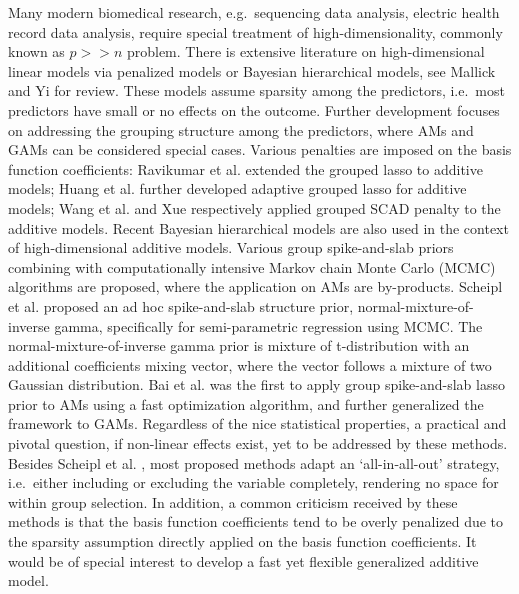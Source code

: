 \documentclass[AMA,STIX1COL,]{WileyNJD-v2}
\begin{document}
Many modern biomedical research, e.g.~sequencing data analysis, electric
health record data analysis, require special treatment of
high-dimensionality, commonly known as \(p >> n\) problem. There is
extensive literature on high-dimensional linear models via penalized
models or Bayesian hierarchical models, see Mallick and Yi
\citep{Mallick2013} for review. These models assume sparsity among the
predictors, i.e.~most predictors have small or no effects on the
outcome. Further development focuses on addressing the grouping
structure among the predictors, where AMs and GAMs can be considered
special cases. Various penalties are imposed on the basis function
coefficients: Ravikumar et al. \citep{Ravikumar2009} extended the
grouped lasso \citep{Yuan2006} to additive models; Huang et al.
\citep{Huang2010} further developed adaptive grouped lasso for additive
models; Wang et al. \citep{Wang2007} and Xue \citep{Xue2009}
respectively applied grouped SCAD penalty \citep{Fan2001} to the
additive models. Recent Bayesian hierarchical models are also used in
the context of high-dimensional additive models. Various group
spike-and-slab priors combining with computationally intensive Markov
chain Monte Carlo (MCMC) algorithms \citep{Xu2015, Yang2020} are
proposed, where the application on AMs are by-products. Scheipl et al.
\citep{Scheipl2012} proposed an ad hoc spike-and-slab structure prior,
normal-mixture-of-inverse gamma, specifically for semi-parametric
regression using MCMC. The normal-mixture-of-inverse gamma prior is
mixture of t-distribution with an additional coefficients mixing vector,
where the vector follows a mixture of two Gaussian distribution. Bai et
al. \citep{Bai2020} was the first to apply group spike-and-slab lasso
prior to AMs using a fast optimization algorithm, and further
generalized the framework to GAMs\citep{Bai2021}. Regardless of the nice
statistical properties, a practical and pivotal question, if non-linear
effects exist, yet to be addressed by these methods. Besides Scheipl et
al. \citep{Scheipl2012}, most proposed methods adapt an `all-in-all-out'
strategy, i.e.~either including or excluding the variable completely,
rendering no space for within group selection. In addition, a common
criticism received by these methods is that the basis function
coefficients tend to be overly penalized due to the sparsity assumption
directly applied on the basis function coefficients.\citep{Scheipl2013}
It would be of special interest to develop a fast yet flexible
generalized additive model.
\end{document}
